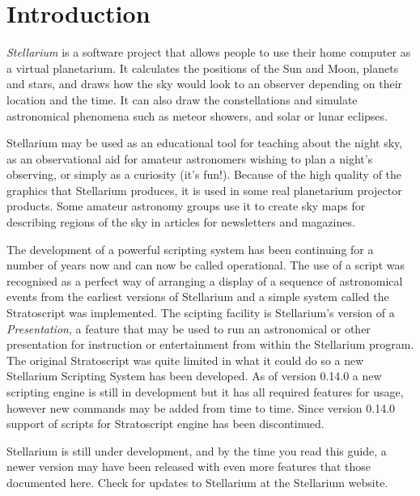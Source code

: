 

\chapter{Introduction}
\label{ch:Introduction}

\emph{Stellarium} is a software project that allows people to use their
home computer as a virtual planetarium. It calculates the positions of
the Sun and Moon, planets and stars, and draws how the sky would look to
an observer depending on their location and the time. It can also draw
the constellations and simulate astronomical phenomena such as meteor
showers, and solar or lunar eclipses.

Stellarium may be used as an educational tool for teaching about the
night sky, as an observational aid for amateur astronomers wishing to
plan a night's observing, or simply as a curiosity (it's fun!). Because
of the high quality of the graphics that Stellarium produces, it is used
in some real planetarium projector products. Some amateur astronomy
groups use it to create sky maps for describing regions of the sky in
articles for newsletters and magazines.

The development of a powerful scripting system has been continuing for
a number of years now and can now be called operational. The use of a
script was recognised as a perfect way of arranging a display of a
sequence of astronomical events from the earliest versions of
Stellarium and a simple system called the Stratoscript was
implemented. The scipting facility is Stellarium's version of a
\emph{Presentation}, a feature that may be used to run an astronomical
or other presentation for instruction or entertainment from within the
Stellarium program. The original Stratoscript was quite limited in
what it could do so a new Stellarium Scripting System has been
developed. As of version 0.14.0 a new scripting engine is still in
development but it has all required features for usage, however new
commands may be added from time to time. Since version 0.14.0 support
of scripts for Stratoscript engine has been discontinued.

Stellarium is still under  development, and by the time you read
this guide, a newer version may have been released with even more
features that those documented here. Check for updates to Stellarium at
the Stellarium website.

